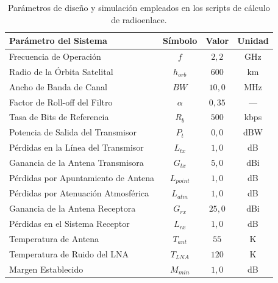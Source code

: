 \begin{table}[H]
    \centering
    \caption{Parámetros de diseño y simulación empleados en los scripts de cálculo de radioenlace.}
    \label{tab:parametros_scripts}
    \begin{tabular}{lccc}
        \hline\hline
        \textbf{Parámetro del Sistema}             & \textbf{Símbolo} & \textbf{Valor}  & \textbf{Unidad} \\
        \hline
        Frecuencia de Operación                    & $f$              & $2{,}2$         & GHz  \\
        Radio de la Órbita Satelital               & $h_{orb}$        & $600$           & km   \\
        Ancho de Banda de Canal                    & $BW$             & $10{,}0$        & MHz  \\
        Factor de Roll-off del Filtro              & $\alpha$         & $0{,}35$        & ---  \\
        Tasa de Bits de Referencia                 & $R_b$            & $500$           & kbps \\
        Potencia de Salida del Transmisor          & $P_t$            & $0{,}0$         & dBW  \\
        Pérdidas en la Línea del Transmisor        & $L_{tx}$         & $1{,}0$         & dB   \\
        Ganancia de la Antena Transmisora          & $G_{tx}$         & $5{,}0$         & dBi  \\
        Pérdidas por Apuntamiento de Antena        & $L_{point}$      & $1{,}0$         & dB   \\
        Pérdidas por Atenuación Atmosférica        & $L_{atm}$        & $1{,}0$         & dB   \\
        Ganancia de la Antena Receptora            & $G_{rx}$         & $25{,}0$        & dBi  \\
        Pérdidas en el Sistema Receptor            & $L_{rx}$         & $1{,}0$         & dB   \\
        Temperatura de Antena                      & $T_{ant}$        & $55$            & K    \\
        Temperatura de Ruido del LNA               & $T_{LNA}$        & $120$           & K    \\
        Margen Establecido                         & $M_{min}$        & $1{,}0$         & dB   \\
        \hline\hline
    \end{tabular}
\end{table}

